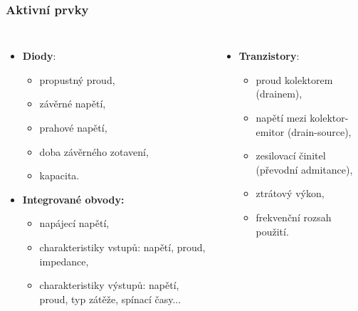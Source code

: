 \documentclass{beamer}
\begin{document}
  \begin{frame}
    \frametitle{Aktivní prvky}
    \begin{columns}
    
    \begin{itemize}
      \item \textbf{Diody}:
        \begin{itemize}
          \item propustný proud,
          \item závěrné napětí,
          \item prahové napětí,
          \item doba závěrného zotavení,
          \item kapacita.
        \end{itemize}
      
      \item \textbf{Integrované obvody:}
        \begin{itemize}
          \item napájecí napětí,
          \item charakteristiky vstupů: napětí, proud, impedance,
          \item charakteristiky výstupů: napětí, proud, typ zátěže, spínací časy...
        \end{itemize}
    \end{itemize}
    
    \begin{itemize}
      \item \textbf{Tranzistory}:
        \begin{itemize}
          \item proud kolektorem (drainem),
          \item napětí mezi kolektor-emitor (drain-source), 
          \item zesilovací činitel (převodní admitance),
          \item ztrátový výkon,
          \item frekvenční rozsah použití.
        \end{itemize}
    \end{itemize}
    \end{columns}
  \end{frame}
\end{document}
